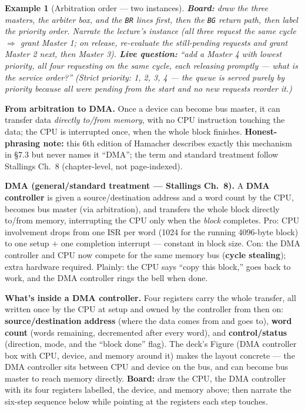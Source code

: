 \documentclass[11pt]{article}
\newtheorem{example}{Example}[section]
\begin{document}
\begin{example}[Arbitration order --- two instances]
\label{ex:arbboard}
\textbf{Board:} draw the three masters, the arbiter box, and the \texttt{BR} lines first, then the \texttt{BG} return path, then label the priority order. Narrate the lecture's instance (all three request the same cycle $\Rightarrow$ grant Master 1; on release, re-evaluate the still-pending requests and grant Master 2 next, then Master 3). \textbf{Live question:} ``add a Master 4 with \emph{lowest} priority, all four requesting on the same cycle, each releasing promptly --- what is the service order?'' (Strict priority: 1, 2, 3, 4 --- the queue is served purely by priority because all were pending from the start and no new requests reorder it.)
\end{example}

\textbf{From arbitration to DMA.} Once a device can become bus master, it can transfer data \emph{directly to/from memory}, with no CPU instruction touching the data; the CPU is interrupted once, when the whole block finishes. \textbf{Honest-phrasing note:} this 6th edition of Hamacher describes exactly this mechanism in \S7.3 but never names it ``DMA''; the term and standard treatment follow Stallings Ch.~8 (chapter-level, not page-indexed).

\textbf{DMA (general/standard treatment --- Stallings Ch.~8).} A \textbf{DMA controller} is given a source/destination address and a word count by the CPU, becomes bus master (via arbitration), and transfers the whole block directly to/from memory, interrupting the CPU only when the \emph{block} completes. Pro: CPU involvement drops from one ISR per word (1024 for the running 4096-byte block) to one setup $+$ one completion interrupt --- constant in block size. Con: the DMA controller and CPU now compete for the same memory bus (\textbf{cycle stealing}); extra hardware required. Plainly: the CPU says ``copy this block,'' goes back to work, and the DMA controller rings the bell when done.

\textbf{What's inside a DMA controller.} Four registers carry the whole transfer, all written once by the CPU at setup and owned by the controller from then on: \textbf{source/destination address} (where the data comes from and goes to), \textbf{word count} (words remaining, decremented after every word), and \textbf{control/status} (direction, mode, and the ``block done'' flag). The deck's Figure (DMA controller box with CPU, device, and memory around it) makes the layout concrete --- the DMA controller sits between CPU and device on the bus, and can become bus master to reach memory directly. \textbf{Board:} draw the CPU, the DMA controller with its four registers labelled, the device, and memory above; then narrate the six-step sequence below while pointing at the registers each step touches.
\end{document}
